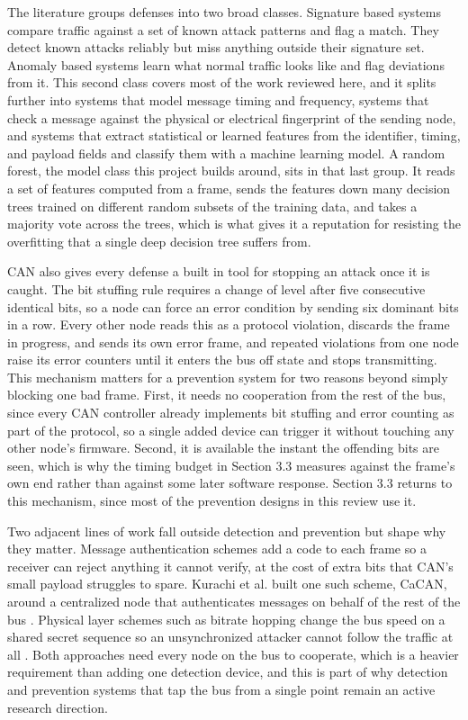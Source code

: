 \documentclass[11pt]{article}
\begin{document}
The literature groups defenses into two broad classes. Signature based systems compare traffic against a set of known attack patterns and flag a match. They detect known attacks reliably but miss anything outside their signature set. Anomaly based systems learn what normal traffic looks like and flag deviations from it. This second class covers most of the work reviewed here, and it splits further into systems that model message timing and frequency, systems that check a message against the physical or electrical fingerprint of the sending node, and systems that extract statistical or learned features from the identifier, timing, and payload fields and classify them with a machine learning model. A random forest, the model class this project builds around, sits in that last group. It reads a set of features computed from a frame, sends the features down many decision trees trained on different random subsets of the training data, and takes a majority vote across the trees, which is what gives it a reputation for resisting the overfitting that a single deep decision tree suffers from.

CAN also gives every defense a built in tool for stopping an attack once it is caught. The bit stuffing rule requires a change of level after five consecutive identical bits, so a node can force an error condition by sending six dominant bits in a row. Every other node reads this as a protocol violation, discards the frame in progress, and sends its own error frame, and repeated violations from one node raise its error counters until it enters the bus off state and stops transmitting. This mechanism matters for a prevention system for two reasons beyond simply blocking one bad frame. First, it needs no cooperation from the rest of the bus, since every CAN controller already implements bit stuffing and error counting as part of the protocol, so a single added device can trigger it without touching any other node's firmware. Second, it is available the instant the offending bits are seen, which is why the timing budget in Section 3.3 measures against the frame's own end rather than against some later software response. Section 3.3 returns to this mechanism, since most of the prevention designs in this review use it.

Two adjacent lines of work fall outside detection and prevention but shape why they matter. Message authentication schemes add a code to each frame so a receiver can reject anything it cannot verify, at the cost of extra bits that CAN's small payload struggles to spare. Kurachi et al. built one such scheme, CaCAN, around a centralized node that authenticates messages on behalf of the rest of the bus \cite{kurachi2014}. Physical layer schemes such as bitrate hopping change the bus speed on a shared secret sequence so an unsynchronized attacker cannot follow the traffic at all \cite{lambert2025}. Both approaches need every node on the bus to cooperate, which is a heavier requirement than adding one detection device, and this is part of why detection and prevention systems that tap the bus from a single point remain an active research direction.
\end{document}
